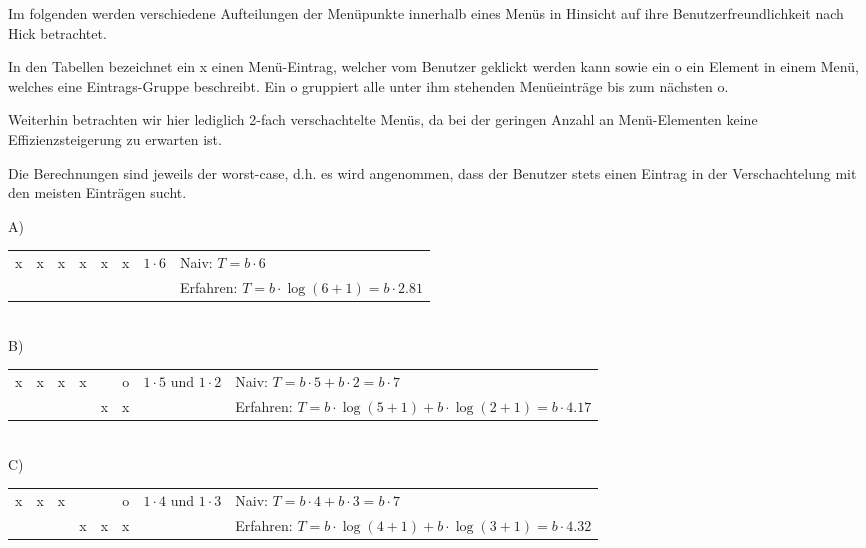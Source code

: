 \documentclass[a4paper,10pt]{article}
\begin{document}
\kopf
\renewcommand{\figurename}{Figure}

Im folgenden werden verschiedene Aufteilungen der Menüpunkte innerhalb eines Menüs in Hinsicht auf ihre Benutzerfreundlichkeit nach Hick betrachtet.

In den Tabellen bezeichnet ein x einen Menü-Eintrag, welcher vom Benutzer geklickt werden kann sowie ein o ein Element in einem Menü, welches eine Eintrags-Gruppe beschreibt. Ein o gruppiert alle unter ihm stehenden Menüeinträge bis zum nächsten o.

Weiterhin betrachten wir hier lediglich 2-fach verschachtelte Menüs, da bei der geringen Anzahl an Menü-Elementen keine Effizienzsteigerung zu erwarten ist.

Die Berechnungen sind jeweils der worst-case, d.h. es wird angenommen, dass der Benutzer stets einen Eintrag in der Verschachtelung mit den meisten Einträgen sucht.

A)\\
\begin{tabular}{|c|c|c|c|c|c|l|l}
\cline{1-6} x & x & x & x & x & x & $1\cdot 6$ \: \: \: \: \: \: \: & Naiv: $T = b\cdot 6$ \\
\cline{1-6}   &   &   &   &   &   &   & Erfahren: $T = b\cdot \log(6+1) = b\cdot 2.81$\\
\cline{1-6}
\end{tabular} \\

B)\\
\begin{tabular}{|c|c|c|c|c|c|l|l}
\cline{1-6} x & x & x & x &   & o & $1\cdot 5$ und $1\cdot 2$ & Naiv: $T = b\cdot 5+b\cdot 2 = b\cdot 7$ \\
\cline{1-6}   &   &   &   & x & x &   & Erfahren: $T = b\cdot \log(5+1)+b\cdot \log(2+1) = b\cdot 4.17$ \\
\cline{1-6}
\end{tabular} \\

C)\\
\begin{tabular}{|c|c|c|c|c|c|l|l}
\cline{1-6} x & x & x &   &   & o & $1\cdot 4$ und $1\cdot 3$ & Naiv: $T = b\cdot 4+b\cdot 3 = b\cdot 7$ \\
\cline{1-6}   &   &   & x & x & x &   & Erfahren: $T = b\cdot \log(4+1)+b\cdot \log(3+1) = b\cdot 4.32$ \\
\cline{1-6}
\end{tabular} \\
\end{document}
